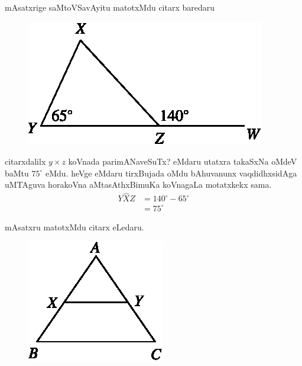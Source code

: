 mAsatxrige saMtoVSavAyitu matotxMdu citarx baredaru
\begin{figure}[H]
\centering
\includegraphics{src/figures/m_179c.eps}
\end{figure}
citarxdalilx $y\times z$ koVnada parimANaveSuTx? eMdaru utatxra takaSxNa oMdeV baMtu $75^\circ$ eMdu. heVge eMdaru tirxBujada oMdu bAhuvanunx vaqdidhxsidAga uMTAguva horakoVna aMtasAthxBimuKa koVnagaLa motatxkekx sama. 
\begin{align*}
Y\hat{X}Z &=140^\circ-65^\circ\\
&=75^\circ
\end{align*}

mAsatxru matotxMdu citarx eLedaru.

\begin{figure}[H]
\centering
\includegraphics{src/figures/m_179d.eps}
\end{figure}

